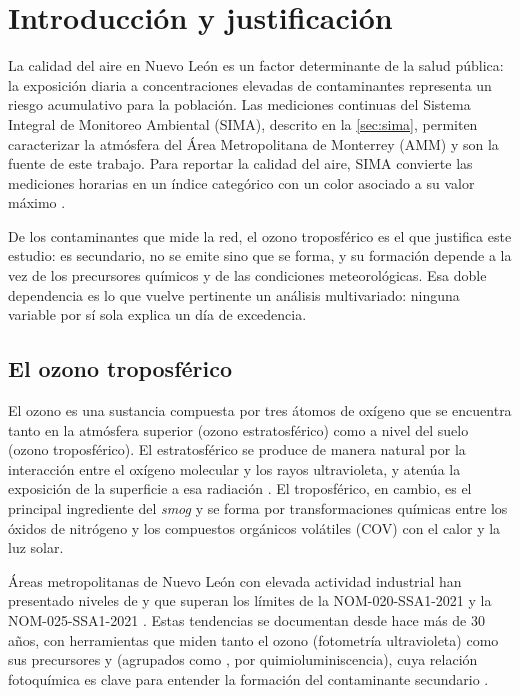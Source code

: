\section{Introducción y justificación}
\label{sec:introduccion}

La calidad del aire en Nuevo León es un factor determinante de la salud
pública: la exposición diaria a concentraciones elevadas de contaminantes
representa un riesgo acumulativo para la población. Las mediciones continuas
del Sistema Integral de Monitoreo Ambiental (SIMA), descrito en la
\cref{sec:sima}, permiten caracterizar la atmósfera del Área Metropolitana
de Monterrey (AMM) y son la fuente de este trabajo. Para reportar la calidad
del aire, SIMA convierte las mediciones horarias en un índice categórico con
un color asociado a su valor máximo \parencite{aireNL2026}.

De los contaminantes que mide la red, el ozono troposférico es el que
justifica este estudio: es secundario, no se emite sino que se forma, y su
formación depende a la vez de los precursores químicos y de las condiciones
meteorológicas. Esa doble dependencia es lo que vuelve pertinente un análisis
multivariado: ninguna variable por sí sola explica un día de excedencia.

\subsection{El ozono troposférico}
\label{sec:objetivo}

El ozono  es una sustancia compuesta por tres átomos de oxígeno que se
encuentra tanto en la atmósfera superior (ozono estratosférico) como a nivel
del suelo (ozono troposférico). El estratosférico se produce de manera
natural por la interacción entre el oxígeno molecular  y los rayos
ultravioleta, y atenúa la exposición de la superficie a esa radiación
\parencite{Bernhard2023-lk}. El troposférico, en cambio, es el principal
ingrediente del \textit{smog} y se forma por transformaciones químicas entre
los óxidos de nitrógeno  y los compuestos orgánicos volátiles (COV)
con el calor y la luz solar.

Áreas metropolitanas de Nuevo León con elevada actividad industrial han
presentado niveles de  y  que superan los límites de la
NOM-020-SSA1-2021 \parencite{nom020ssa1} y la NOM-025-SSA1-2021
\parencite{nom025ssa1}. Estas tendencias se documentan desde hace más de
30 años, con herramientas que miden tanto el ozono (fotometría ultravioleta)
como sus precursores  y  (agrupados como , por
quimioluminiscencia), cuya relación fotoquímica es clave para entender la
formación del contaminante secundario \parencite{SanfordSillman}.

